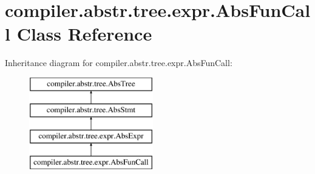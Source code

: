 \hypertarget{classcompiler_1_1abstr_1_1tree_1_1expr_1_1_abs_fun_call}{}\section{compiler.\+abstr.\+tree.\+expr.\+Abs\+Fun\+Call Class Reference}
\label{classcompiler_1_1abstr_1_1tree_1_1expr_1_1_abs_fun_call}
Inheritance diagram for compiler.\+abstr.\+tree.\+expr.\+Abs\+Fun\+Call\+:\begin{figure}[H]
\begin{center}
\leavevmode
\includegraphics[height=4.000000cm]{classcompiler_1_1abstr_1_1tree_1_1expr_1_1_abs_fun_call}
\end{center}
\end{figure}
